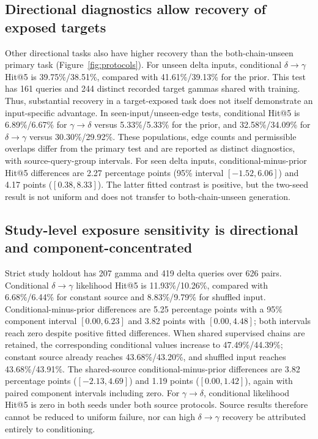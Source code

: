 \documentclass[12pt]{article}
\newcommand{\gtd}{\mbox{\ensuremath{\gamma\!\rightarrow\!\delta}}}
\newcommand{\dtg}{\mbox{\ensuremath{\delta\!\rightarrow\!\gamma}}}
\begin{document}
\subsection{Directional diagnostics allow recovery of exposed targets}
Other directional tasks also have higher recovery than the both-chain-unseen
primary task (Figure~\ref{fig:protocols}). For unseen delta inputs, conditional \dtg{} Hit@5 is 39.75\%/38.51\%,
compared with 41.61\%/39.13\% for the prior. This test has 161 queries and
244 distinct recorded target gammas shared with training. Thus, substantial
recovery in a target-exposed task does not itself demonstrate an input-specific
advantage. In seen-input/unseen-edge tests, conditional Hit@5 is
6.89\%/6.67\% for \gtd{} versus 5.33\%/5.33\% for the prior, and
32.58\%/34.09\% for \dtg{} versus 30.30\%/29.92\%. These populations,
edge counts and permissible overlaps differ from the primary test and are
reported as distinct diagnostics, with source-query-group intervals.
For seen delta inputs, conditional-minus-prior Hit@5 differences are 2.27
percentage points (95\% interval $[-1.52,6.06]$) and 4.17 points
($[0.38,8.33]$). The latter fitted contrast is positive, but the two-seed
result is not uniform and does not transfer to both-chain-unseen generation.

\subsection{Study-level exposure sensitivity is directional and component-concentrated}
Strict study holdout has 207 gamma and 419 delta queries over 626 pairs.
Conditional \dtg{} likelihood Hit@5 is 11.93\%/10.26\%, compared with
6.68\%/6.44\% for constant source and 8.83\%/9.79\% for shuffled input.
Conditional-minus-prior differences are 5.25 percentage points with a 95\%
component interval $[0.00,6.23]$ and 3.82 points with $[0.00,4.48]$;
both intervals reach zero despite positive fitted differences.
When shared supervised chains are retained, the corresponding conditional
values increase to 47.49\%/44.39\%; constant source already reaches
43.68\%/43.20\%, and shuffled input reaches 43.68\%/43.91\%.
The shared-source conditional-minus-prior differences are 3.82 percentage
points ($[-2.13,4.69]$) and 1.19 points ($[0.00,1.42]$), again with paired
component intervals including zero.
For \gtd{}, conditional likelihood Hit@5 is zero in both seeds under both
source protocols. Source results therefore cannot be reduced to uniform
failure, nor can high \dtg{} recovery be attributed entirely to conditioning.
\end{document}
